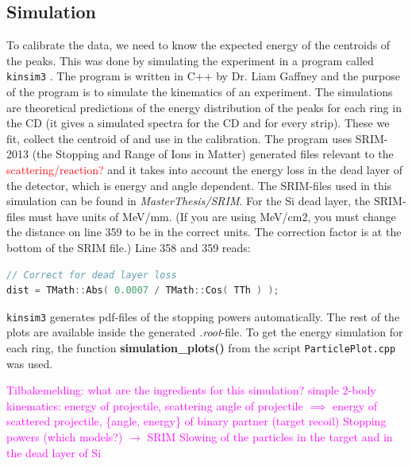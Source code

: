 \documentclass[twoside,english]{uiofysmaster/uiofysmaster}
\begin{document}
\subsection{Simulation}
To calibrate the data, we need to know the expected energy of the centroids of the peaks. 
This was done by simulating the experiment in a program called \texttt{kinsim3} \cite{kinsim}. 
The program is written in C++ by Dr. Liam Gaffney and the purpose of the program is to simulate the kinematics of an experiment. 
The simulations are theoretical predictions of the energy distribution of the peaks for each ring in the CD (it gives a simulated spectra for the CD and for every strip).
These we fit, collect the centroid of and use in the calibration.
The program uses SRIM-2013 \cite{SRIM} (the Stopping and Range of Ions in Matter) generated files relevant to the \textcolor{red}{scattering/reaction?} and it takes into account the energy loss in the dead layer of the detector, which is energy and angle dependent. 
The SRIM-files used in this simulation can be found in \textit{MasterThesis/SRIM}.
For the Si dead layer, the SRIM-files must have units of MeV/mm. 
(If you are using MeV/cm2, you must change the distance on line 359 to be in the correct units. 
The correction factor is at the bottom of the SRIM file.)
Line 358 and 359 reads:

\begin{lstlisting}[language=c++]
// Correct for dead layer loss
dist = TMath::Abs( 0.0007 / TMath::Cos( TTh ) );
\end{lstlisting}

\texttt{kinsim3} generates pdf-files of the stopping powers automatically. 
The rest of the plots are available inside the generated \textit{.root}-file. 
To get the energy simulation for each ring, the function \textbf{simulation\_plots()} from the script \texttt{ParticlePlot.cpp} was used. 

\textcolor{Magenta}{Tilbakemelding: \newline 
what are the ingredients for this simulation? \newline
simple 2-body kinematics: energy of projectile, scattering angle of projectile $\implies$ energy of scattered projectile, \{angle, energy\} of binary partner (target recoil) \newline
Stopping powers (which models?) $\rightarrow$ SRIM \newline
Slowing of the particles in the target and in the dead layer of Si
}

\bigskip
\end{document}

